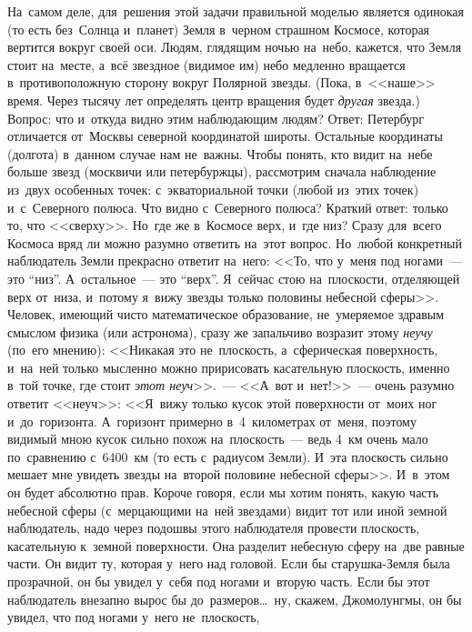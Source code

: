 {\baselineskip=13pt

На~самом деле, для~решения этой задачи правильной моделью является одинокая (то есть без~Солнца
и~планет) Земля в~черном страшном Космосе, которая вертится вокруг своей оси. Людям, глядящим ночью
на~небо, кажется, что Земля стоит на~месте, а~всё звездное (видимое им) небо медленно вращается
в~противоположную сторону вокруг Полярной звезды. (Пока, в~<<наше>> время. Через тысячу лет
определять центр вращения будет \textit{другая} звезда.) Вопрос: что и~откуда видно этим наблюдающим людям?
Ответ: Петербург отличается от~Москвы северной координатой широты. Остальные координаты (долгота)
в~данном случае нам не~важны. Чтобы понять, кто видит на~небе больше звезд (москвичи или
петербуржцы), рассмотрим сначала наблюдение из~двух особенных точек: с~экваториальной точки (любой
из~этих точек) и~с~Северного полюса. Что видно с~Северного полюса? Краткий ответ: только то, что
<<сверху>>. Но~где же в~Космосе верх, и~где низ? Сразу для~всего Космоса вряд ли можно разумно
ответить на~этот вопрос. Но~любой конкретный наблюдатель Земли прекрасно ответит на~него: <<То, что
у~меня под ногами~--- это ``низ''. А~остальное~--- это ``верх''. Я~сейчас стою на~плоскости,
отделяющей верх от~низа, и~потому я~вижу звезды только половины небесной сферы>>. Человек, имеющий
чисто математическое образование, не~умеряемое здравым смыслом физика (или астронома), сразу же
запальчиво возразит этому \textit{неучу} (по~его мнению): <<Никакая это не~плоскость, а~сферическая
поверхность, и~на~ней только мысленно можно пририсовать касательную плоскость, именно в~той точке,
где стоит \textit{этот неуч}>>.~--- <<А~вот и~нет!>>~--- очень разумно ответит <<неуч>>: <<Я~вижу только кусок этой
поверхности от~моих ног и~до~горизонта. А~горизонт примерно в~4~километрах от~меня, поэтому видимый
мною кусок сильно похож на~плоскость~--- ведь 4~км очень мало по~сравнению с~6400~км (то есть
с~радиусом Земли). И~эта плоскость сильно мешает мне увидеть звезды на~второй половине небесной
сферы>>. И~в~этом он будет абсолютно прав. Короче говоря, если мы хотим понять, какую часть небесной
сферы (с~мерцающими на~ней звездами) видит тот или иной земной наблюдатель, надо через подошвы
этого наблюдателя провести плоскость, касательную к~земной поверхности. Она разделит небесную сферу
на~две равные части. Он видит ту, которая у~него над головой. Если бы старушка-Земля была
прозрачной, он бы увидел у~себя под ногами и~вторую часть. Если бы этот наблюдатель внезапно вырос
бы до~размеров\ldots\ ну, скажем, Джомолунгмы, он бы увидел, что под ногами у~него не~плоскость,
}
